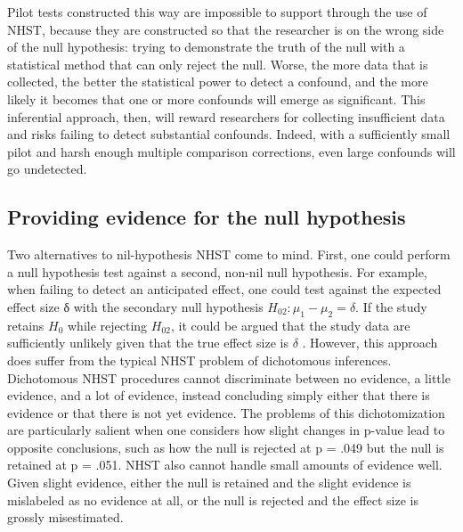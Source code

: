 \documentclass[fignum,nobf,man]{apa}
\begin{document}
Pilot tests constructed this way are impossible to support through the use of NHST, because they are constructed so that the researcher is on the wrong side of the null hypothesis: trying to demonstrate the truth of the null with a statistical method that can only reject the null. Worse, the more data that is collected, the better the statistical power to detect a confound, and the more likely it becomes that one or more confounds will emerge as significant. This inferential approach, then, will reward researchers for collecting insufficient data and risks failing to detect substantial confounds. Indeed, with a sufficiently small pilot and harsh enough multiple comparison corrections, even large confounds will go undetected.

\subsection{Providing evidence for the null hypothesis}
Two alternatives to nil-hypothesis NHST come to mind. First, one could perform a null hypothesis test against a second, non-nil null hypothesis. For example, when failing to detect an anticipated effect, one could test against the expected effect size δ with the secondary null hypothesis $H_{02}: \mu_1 - \mu_2 = \delta$. If the study retains $H_0$ while rejecting $H_{02}$, it could be argued that the study data are sufficiently unlikely given that the true effect size is $\delta$ \citep[e.g.,][]{Simonsohn:etal:2014}. However, this approach does suffer from the typical NHST problem of dichotomous inferences. Dichotomous NHST procedures cannot discriminate between no evidence, a little evidence, and a lot of evidence, instead concluding simply either that there is evidence or that there is not yet evidence. The problems of this dichotomization are particularly salient when one considers how slight changes in p-value lead to opposite conclusions, such as how the null is rejected at p = .049 but the null is retained at p = .051. NHST also cannot handle small amounts of evidence well. Given slight evidence, either the null is retained and the slight evidence is mislabeled as no evidence at all, or the null is rejected and the effect size is grossly misestimated. 
\end{document}
